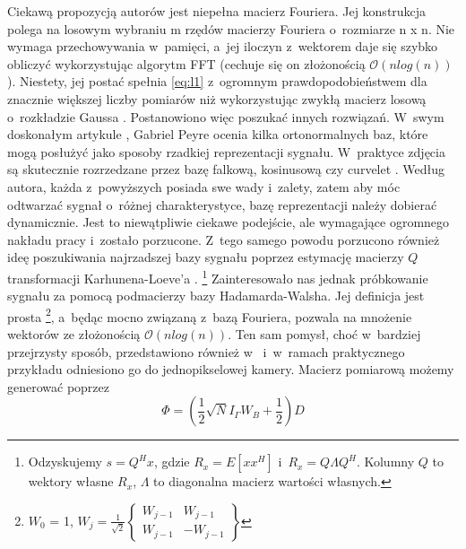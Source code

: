 Ciekawą propozycją autorów jest niepełna macierz Fouriera. Jej konstrukcja polega na losowym wybraniu m rzędów macierzy Fouriera o~rozmiarze n x n. Nie wymaga przechowywania w~pamięci, a~jej iloczyn z~wektorem daje się szybko obliczyć wykorzystując algorytm FFT (cechuje się on złożonością $\mathcal{O}(nlog(n))$). Niestety, jej postać spełnia \ref{eq:l1} z~ogromnym prawdopodobieństwem dla znacznie większej liczby pomiarów niż wykorzystując zwykłą macierz losową o~rozkładzie Gaussa  \cite{Rudelson2008}. Postanowiono więc poszukać innych rozwiązań. W~swym doskonałym artykule \cite{Peyre2010}, Gabriel Peyre ocenia kilka ortonormalnych baz, które mogą posłużyć jako sposoby rzadkiej reprezentacji sygnału. W~praktyce zdjęcia są skutecznie rozrzedzane przez bazę falkową, kosinusową czy curvelet \cite{CurveletWebSite, Candes2000}. Według autora, każda z~powyższych posiada swe wady i~zalety, zatem aby móc odtwarzać sygnał o~różnej charakterystyce, bazę reprezentacji należy dobierać dynamicznie. Jest to niewątpliwie ciekawe podejście, ale wymagające ogromnego nakładu pracy i~zostało porzucone. Z~tego samego powodu porzucono również ideę poszukiwania najrzadszej bazy sygnału poprzez estymację macierzy $Q$ transformacji Karhunena-Loeve'a \cite{Gwon2012}. \footnote{Odzyskujemy $s = Q^H x$, gdzie $R_x = E[xx^H]$ i~$R_x = Q \Lambda Q^H$. Kolumny $Q$ to wektory własne $R_x$, $\Lambda$ to diagonalna macierz wartości własnych.} Zainteresowało nas jednak próbkowanie sygnału za pomocą podmacierzy bazy Hadamarda-Walsha. Jej definicja jest prosta \footnote{$W_0$ = 1, $W_j = \frac{1}{\sqrt{2}} \begin{Bmatrix} W_{j-1} & W_{j-1} \\ W_{j-1} & -W_{j-1} \end{Bmatrix}$}, a~będąc mocno związaną z~bazą Fouriera, pozwala na mnożenie wektorów ze złożonością $\mathcal{O}(nlog(n))$. Ten sam pomysł, choć w~bardziej przejrzysty sposób, przedstawiono również w~\cite{Davenport2010} i~w~ramach praktycznego przykładu odniesiono go do jednopikselowej kamery. Macierz pomiarową możemy generować poprzez 
\begin{equation}
	\Phi = \left(\frac{1}{2} \sqrt{N} I_\Gamma W_B + \frac{1}{2} \right) D
\end{equation}
